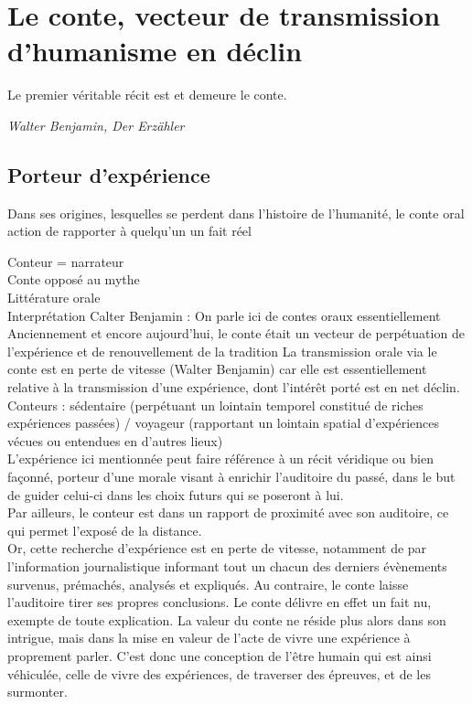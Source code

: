 \section{Le conte, vecteur de transmission d'humanisme en déclin}

\begin{shadequote}
Le premier véritable récit est et demeure le conte. \par\emph{Walter Benjamin, Der Erzähler}
\end{shadequote}


\subsection{Porteur d'expérience}
Dans ses origines, lesquelles se perdent dans l'histoire de l'humanité, le conte oral 
action de rapporter à quelqu'un un fait réel \cite{cnrtl}

Conteur = narrateur\\
Conte opposé au mythe\\
Littérature orale\\

Interprétation Calter Benjamin : \cite{nouss2003conteur}
On parle ici de contes oraux essentiellement
Anciennement et encore aujourd'hui, le conte était un vecteur de perpétuation de l'expérience et de renouvellement de la tradition
La transmission orale via le conte est en perte de vitesse (Walter Benjamin\cite{benjamin1991gesammelte}) car elle est essentiellement relative à la transmission d'une expérience, dont l'intérêt porté est en net déclin.\\
Conteurs : sédentaire (perpétuant un lointain temporel constitué de riches expériences passées) / voyageur (rapportant un lointain spatial d'expériences vécues ou entendues en d'autres lieux)\\

L'expérience ici mentionnée peut faire référence à un récit véridique ou bien façonné, porteur d'une morale visant à enrichir l'auditoire du passé, dans le but de guider celui-ci dans les choix futurs qui se poseront à lui.\\
Par ailleurs, le conteur est dans un rapport de proximité avec son auditoire, ce qui permet l'exposé de la distance.\\
Or, cette recherche d'expérience est en perte de vitesse, notamment de par l'information journalistique informant tout un chacun des derniers évènements survenus, prémachés, analysés et expliqués. Au contraire, le conte laisse l'auditoire tirer ses propres conclusions. Le conte délivre en effet un fait nu, exempte de toute explication. La valeur du conte ne réside plus alors dans son intrigue, mais dans la mise en valeur de l'acte de vivre une expérience à proprement parler. C'est donc une conception de l'être humain qui est ainsi véhiculée, celle de vivre des expériences, de traverser des épreuves, et de les surmonter.\\

